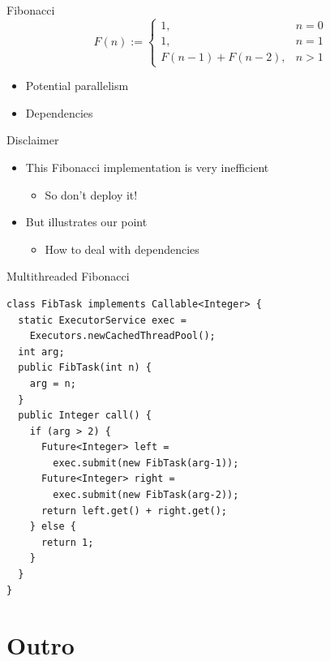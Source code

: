 \begin{frame}{Fibonacci}
  \large{
    \begin{equation*}
      F(n) := 
      \begin{cases}
        1, & n = 0 \\
        1, & n = 1 \\
        F(n-1) + F(n-2), & n > 1
      \end{cases}
    \end{equation*}
  }


  \begin{itemize}
  \item Potential parallelism
  \item Dependencies
  \end{itemize}
\end{frame}

\begin{frame}{Disclaimer}  
  \begin{itemize}
  \item This Fibonacci implementation is very inefficient
    \begin{itemize}
    \item So don’t deploy it!
    \end{itemize}
  \item But illustrates our point
    \begin{itemize}
    \item How to deal with dependencies  
    \end{itemize}
  \end{itemize}
\end{frame}

\begin{frame}[fragile]{Multithreaded Fibonacci}
\begin{lstlisting}[basicstyle=\fontsize{9}{11}\selectfont\ttfamily]
class FibTask implements Callable<Integer> {
  static ExecutorService exec = 
    Executors.newCachedThreadPool();
  int arg;
  public FibTask(int n) {
    arg = n;
  }
  public Integer call() {
    if (arg > 2) {
      Future<Integer> left = 
        exec.submit(new FibTask(arg-1));
      Future<Integer> right = 
        exec.submit(new FibTask(arg-2));
      return left.get() + right.get();
    } else {
      return 1;
    }
  }
}
\end{lstlisting}
\end{frame}


\section*{Outro}

